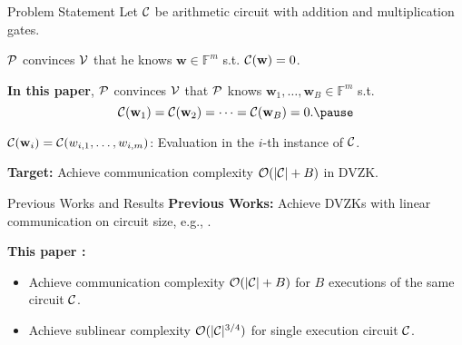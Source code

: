 \begin{frame}{Problem Statement}
	Let $\mathcal{C}$ be arithmetic circuit with addition and multiplication gates.\pause
	
	$\mathcal{P}$ convinces $\mathcal{V}$ that he knows $\mathbf{w} \in \mathbb{F}^m$ s.t. $\mathcal{C}(\mathbf{w}) = 0$.\pause
	
	\textbf{In this paper}, $\mathcal{P}$ convinces $\mathcal{V}$ that $\mathcal{P}$ knows $\mathbf{w}_1, \dots, \mathbf{w}_B \in \mathbb{F}^m$ s.t.\pause
	\begin{equation*}
		\Circuit(\mathbf{w}_1) = \Circuit(\mathbf{w}_2) = \dots = \Circuit(\mathbf{w}_B) = 0.\pause
	\end{equation*}

	$\mathcal{C}(\mathbf{w}_i) = \mathcal{C}(w_{i,1}, \dots, w_{i, m})$: Evaluation in the $i$-th instance of $\mathcal{C}$.\pause
	
	\textbf{Target:} Achieve communication complexity $\mathcal{O}(|\mathcal{C}| + B)$ in DVZK.\pause
\end{frame}
\begin{frame}{Previous Works and Results}
	\textbf{Previous Works:} Achieve DVZKs with linear communication on circuit size, e.g., \cite{YangSWW21, BaumBMRS21, DittmerILO22}.\pause
	
	\textbf{This paper \cite{Weng0YX022}:}\pause
	\begin{itemize}
		\item Achieve communication complexity $\mathcal{O}(|\mathcal{C}| + B)$ for $B$ executions of the same circuit $\mathcal{C}$. \pause
		\item Achieve sublinear complexity $\mathcal{O}(|\mathcal{C}|^{3/4})$ for single execution circuit $\mathcal{C}$. 
	\end{itemize}
\end{frame}